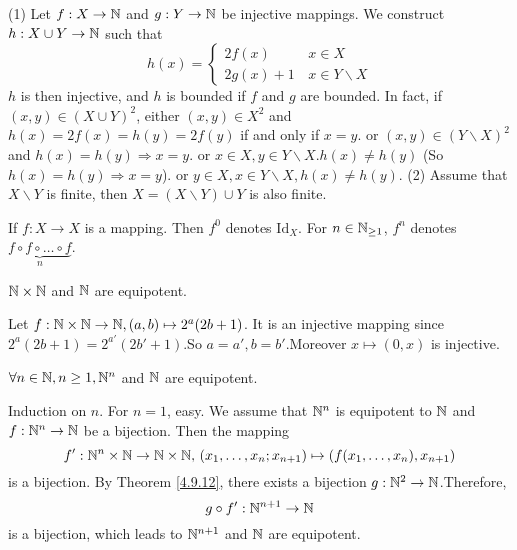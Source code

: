 \begin{proofenv}
    \quad
    \newline
    (1) Let $f:X\rightarrow \NN$ and $g:Y\rightarrow \NN$ be injective mappings. We construct $h:X\cup Y\rightarrow \NN$ such that 
    $$h(x)=\left\{\begin{matrix}
     2f(x)\,  &x\in X\\
    2g(x)+1\, &x\in Y\backslash X

    \end{matrix}\right.$$
    $h$ is then injective,  and $h$ is bounded if $f$ and $g$ are bounded.
    \newline
    In fact,  if $(x, y)\in (X\cup Y)^2$, 
    \newline
    either $(x, y)\in X^2$ and $h(x)=2f(x)=h(y)=2f(y)$ if and only if $x=y$.
    \newline
    or $(x, y)\in (Y\backslash X)^2$ and $h(x)=h(y)\Rightarrow x=y$.
    \newline
    or $x\in X, y\in Y\backslash X.h(x)\not=h(y)$ (So $h(x)=h(y)\Rightarrow x=y$).
    \newline
    or $y\in X, x\in Y\backslash X , h(x)\not=h(y)$.
    \newline
    (2)  Assume that $X\backslash Y$ is finite,  then $X=(X\backslash Y)\cup Y$ is also finite.
\end{proofenv}
\begin{notationenv}
    If $f:X\rightarrow X$  is a mapping. Then $f^0$ denotes $\mathrm{Id}_X$. For $n\in\NN_{\ge 1}$, $f^n$ denotes $\underset{n}{\underbrace{f\circ f\circ \dots \circ f}}$. 
\end{notationenv}
\begin{theoremenv}\label{4.9.12}
    $\NN\times\NN$ and $\NN$ are equipotent.
\end{theoremenv}
\begin{proofenv}
    Let $f:\NN\times\NN\rightarrow \NN, (a, b)\mapsto2^a(2b+1)$. It is an injective mapping since $2^a(2b+1)=2^{a'}(2b'+1)$.So $a=a', b=b'$.Moreover $x\mapsto(0, x)$ is injective.
\end{proofenv}
\begin{corollaryenv}
    $\forall n\in \NN,  n\ge 1, \NN^n$ and $\NN$ are equipotent.
\end{corollaryenv}
\begin{proofenv}
    Induction on $n$.
    \newline
    For $n=1$,  easy. We assume that $\NN^n$ is equipotent to $\NN$ and $f:\NN^n\rightarrow\NN$ be a bijection. Then the mapping
    $$f':\NN^n\times \NN\rightarrow \NN\times\NN, \, \left(x_1, \dots, x_n;x_{n+1}\right)\mapsto\left(f(x_1, \dots, x_n), x_{n+1}\right)$$ 
    is a bijection. By Theorem \ref{4.9.12},  there exists a bijection $g:\NN^2\rightarrow\NN$.Therefore, 
    $$g\circ f':\NN^{n+1}\rightarrow\NN$$
    is a bijection,  which leads to $\NN^{n+1}$ and $\NN$ are equipotent.
\end{proofenv}

